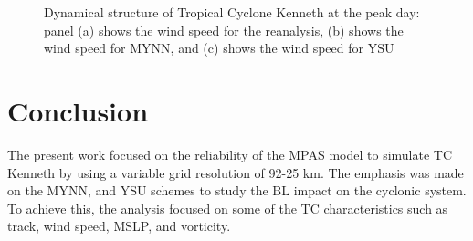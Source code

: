 \documentclass[8pt,a4paper]{article}
\begin{document}
	\begin{figure}[H]
		
		
		\centering
		
		\caption{Dynamical structure of Tropical Cyclone Kenneth at the peak day: panel (a) shows the wind speed for the reanalysis, (b) shows the wind speed for MYNN, and (c) shows the wind speed for YSU}
		\label{fig:4.4}
	\end{figure}


	\section{Conclusion}
	
	The present work focused on the reliability of the MPAS model to simulate TC Kenneth by using a variable grid resolution of 92-25 km. The emphasis was made on the MYNN, and YSU schemes to study the BL impact on the cyclonic system. To achieve this, the analysis focused on some of the TC characteristics such as track, wind speed, MSLP, and vorticity.
	
\end{document}
